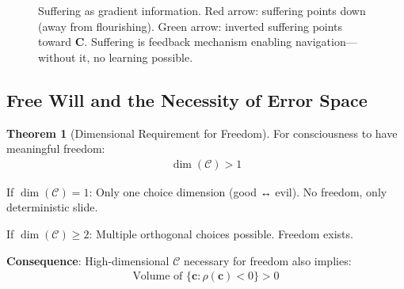 \documentclass[11pt,a4paper]{article}
\theoremstyle{definition}
\newtheorem{theorem}{Theorem}[section]
\theoremstyle{remark}
\newcommand{\CC}{\mathcal{C}}
\newcommand{\cc}{\mathbf{c}}
\begin{document}
\begin{enumerate}
\begin{figure}[H]
\caption{Suffering as gradient information. Red arrow: suffering points down (away from flourishing). Green arrow: inverted suffering points toward \(\mathbf{C}\). Suffering is feedback mechanism enabling navigation—without it, no learning possible.}
\label{fig:suffering_gradient}
\end{figure}

\subsection{Free Will and the Necessity of Error Space}

\begin{theorem}[Dimensional Requirement for Freedom]
For consciousness to have meaningful freedom:
\begin{align}
\dim(\CC) > 1
\end{align}

If \(\dim(\CC) = 1\): Only one choice dimension (good ↔ evil). No freedom, only deterministic slide.

If \(\dim(\CC) \geq 2\): Multiple orthogonal choices possible. Freedom exists.

\textbf{Consequence}: High-dimensional \(\CC\) necessary for freedom also implies:
\begin{align}
\text{Volume of } \{\cc : \rho(\cc) < 0\} > 0
\end{align}


\end{theorem}
\end{enumerate}
\end{document}
